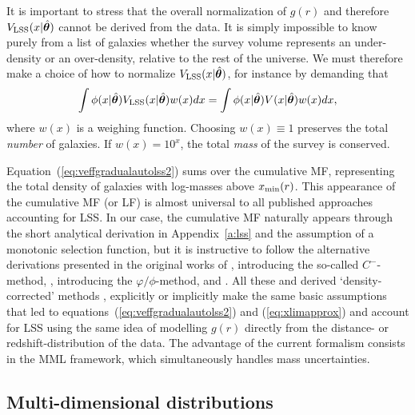 \documentclass[a4paper,fleqn,usenatbib]{mnras}
\newcommand{\be}{\begin{equation}}
\newcommand{\ee}{\end{equation}}
\newcommand{\veff}{V}%
\newcommand{\vefflss}{V_{\rm LSS}}%
\newcommand{\Eq}[1]{Equation~(\ref{eq:#1})}
\renewcommand{\a}[1]{Appendix~\ref{a:#1}}
\newcommand{\para}{{\bm{\theta}}}
\begin{document}
It is important to stress that the overall normalization of $g(r)$ and therefore $\vefflss(x|\hat\para)$ cannot be derived from the data. It is simply impossible to know purely from a list of galaxies whether the survey volume represents an under-density or an over-density, relative to the rest of the universe. We must therefore make a choice of how to normalize $\vefflss(x|\hat\para)$, for instance by demanding that
%
\be\label{eq:lssnormalization}
	\int\phi(x|\hat\para)\vefflss(x|\hat\para)w(x)dx = \int\phi(x|\hat\para)\veff(x|\hat\para)w(x)dx,
\ee
%
where $w(x)$ is a weighing function. Choosing $w(x)\equiv1$ preserves the total \emph{number} of galaxies. If $w(x)=10^x$, the total \emph{mass} of the survey is conserved.

\Eq{veffgradualautolss2} sums over the cumulative MF, representing the total density of galaxies with log-masses above $x_{\rm min}(r)$. This appearance of the cumulative MF (or LF) is almost universal to all published approaches accounting for LSS. In our case, the cumulative MF naturally appears through the short analytical derivation in \a{lss} and the assumption of a monotonic selection function, but it is instructive to follow the alternative derivations presented in the original works of \cite{Lynden-Bell1971}, introducing the so-called $C^{-}$-method, \cite{Turner1979}, introducing the $\varphi/\phi$-method, \cite{Sandage1979} and \cite{Kirshner1979}. All these and derived `density-corrected' methods \citep[e.g.]{Baldry2012,Wright2017}, explicitly or implicitly make the same basic assumptions that led to equations~(\ref{eq:veffgradualautolss2}) and (\ref{eq:xlimapprox}) and account for LSS using the same idea of modelling $g(r)$ directly from the distance- or redshift-distribution of the data. The advantage of the current formalism consists in the MML framework, which simultaneously handles mass uncertainties.

\subsection{\!\!Multi-dimensional distributions}\label{ss:multi}
\end{document}
